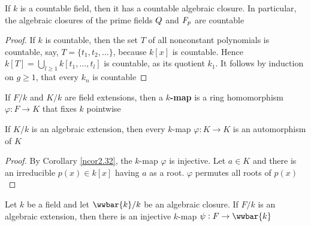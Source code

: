 \documentclass[11pt]{article}
\begin{document}
\begin{corollary}[]
If \(k\) is a countable field, then it has a countable algebraic closure. In
particular, the algebraic closures of the prime fields \(\relax{Q}\) and \(\relax{F}_p\)
are countable
\end{corollary}

\begin{proof}
If \(k\) is countable, then the set \(T\) of all nonconstant polynomials is
countable, say, \(T=\{t_1,t_2,\dots\}\), because \(k[x]\) is countable. Hence 
\(k[T]=\bigcup_{l\ge1}k[t_1,\dots,t_l]\) is countable, as its quotient
\(k_1\). It follows by induction on \(g\ge1\), that every \(k_n\) is countable
\end{proof}

\begin{definition}[]
If \(F/k\) and \(K/k\) are field extensions, then a \textbf{\(k\)-map} is a ring
homomorphism \(\varphi:F\to K\) that fixes \(k\) pointwise
\end{definition}

\begin{lemma}[]
\label{nlemma5.59}
If \(K/k\) is an algebraic extension, then every \(k\)-map
\(\varphi:K\to K\) is an automorphism of \(K\)
\end{lemma}

\begin{proof}
By Corollary \ref{ncor2.32}, the \(k\)-map \(\varphi\) is injective. Let \(a\in K\) and
there is an irreducible \(p(x)\in k[x]\) having \(a\) as a root. \(\varphi\) permutes
all roots of \(p(x)\)
\end{proof}

\begin{lemma}[]
\label{nlemma5.60}
Let \(k\) be a field and let \(\wwbar{k}/k\) be an algebraic closure. If
\(F/k\) is an algebraic extension, then there is an injective \(k\)-map
\(\psi:F\to\wwbar{k}\)
\end{lemma}
\end{document}
